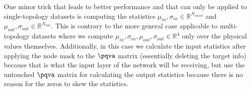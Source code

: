 One minor trick that leads to better performance and that can only be applied to single-topology datasets is computing the statistics
$\mu_{in}, \sigma_{in} \in \mathbb{R}^{N_{const}}$ and $\mu_{out}, \sigma_{out} \in \mathbb{R}^{N_{var}}$.
This is contrary to the more general case applicable to multi-topology datasets where we compute
$\mu_{in}, \sigma_{in}, \mu_{out}, \sigma_{out} \in \mathbb{R}^4$ only over the physical values themselves.
Additionally, in this case we calculate the input statistics after applying the node mask to the $\pqva$ matrix
(essentially deleting the target info) because that is what the input layer of the network will be receiving, but
use the untouched $\pqva$ matrix for calculating the output statistics because there is no reason for the zeros
to skew the statistics.

\mbox{}\\
